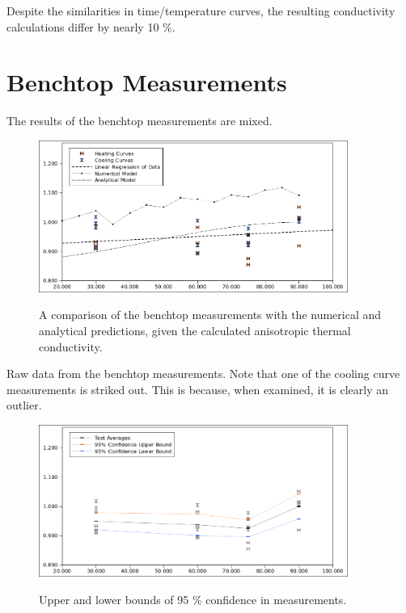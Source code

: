 \begin{table}[h]
\centering

\label{tab:conv_kvals}
\caption{Despite the similarities in time/temperature curves, the resulting 
conductivity calculations differ by nearly 10 \%.}
\end{table}

\section{Benchtop Measurements}

The results of the benchtop measurements are mixed.

\begin{figure}[h]
\centering
\includegraphics[width=0.9\textwidth]{fig/test_results.png}
\label{fig:test_results}
\caption{A comparison of the benchtop measurements with the numerical and
analytical predictions, given the calculated anisotropic thermal conductivity.}
\end{figure}

\begin{table}[h]
\centering

\label{tab:powders}
\caption{Raw data from the benchtop measurements. Note that one of the cooling curve measurements is striked out. This is because, when examined, it is clearly an outlier.}
\end{table}


\begin{figure}[h]
\centering
\includegraphics[width=0.9\textwidth]{fig/test_results_confidence.png}
\label{fig:test_confidence}
\caption{Upper and lower bounds of 95 \% confidence in measurements.}
\end{figure}

